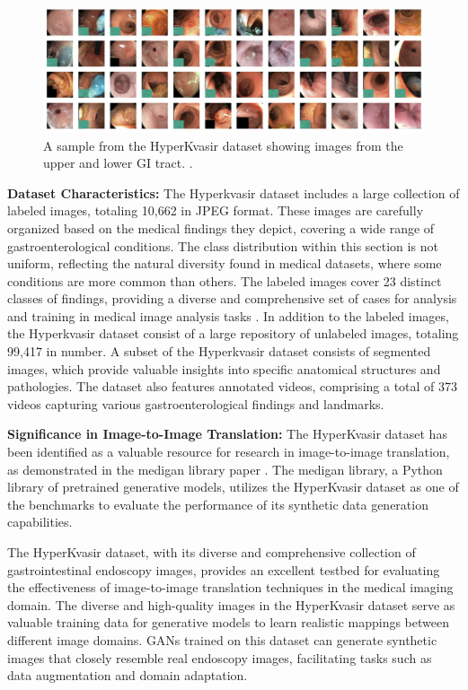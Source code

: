 \documentclass[UKenglish,12pt]{master-style}
\begin{document}
\begin{figure}[ht]
    \centering
    \includegraphics[width=1\textwidth]{Images/hyperKvasir.png}
    \caption{A sample from the HyperKvasir dataset showing images from the upper and lower GI tract.  \cite{HyperKvasir_Dataset}.}
    \label{fig:hyperKvasir}
\end{figure}

\textbf{Dataset Characteristics:} The Hyperkvasir dataset includes a large collection of labeled images, totaling 10,662 in JPEG format. These images are carefully organized based on the medical findings they depict, covering a wide range of gastroenterological conditions. The class distribution within this section is not uniform, reflecting the natural diversity found in medical datasets, where some conditions are more common than others. The labeled images cover 23 distinct classes of findings, providing a diverse and comprehensive set of cases for analysis and training in medical image analysis tasks \cite{HyperKvasir_Dataset}. In addition to the labeled images, the Hyperkvasir dataset consist of a large repository of unlabeled images, totaling 99,417 in number. A subset of the Hyperkvasir dataset consists of segmented images, which provide valuable insights into specific anatomical structures and pathologies. The dataset also features annotated videos, comprising a total of 373 videos capturing various gastroenterological findings and landmarks. 

\textbf{Significance in Image-to-Image Translation: } The HyperKvasir dataset has been identified as a valuable resource for research in image-to-image translation, as demonstrated in the medigan library paper \cite{medigan}.  The medigan library, a Python library of pretrained generative models, utilizes the HyperKvasir dataset as one of the benchmarks to evaluate the performance of its synthetic data generation capabilities. 

The HyperKvasir dataset, with its diverse and comprehensive collection of gastrointestinal endoscopy images, provides an excellent testbed for evaluating the effectiveness of image-to-image translation techniques in the medical imaging domain. The diverse and high-quality images in the HyperKvasir dataset serve as valuable training data for generative models to learn realistic mappings between different image domains. GANs trained on this dataset can generate synthetic images that closely resemble real endoscopy images, facilitating tasks such as data augmentation and domain adaptation.
\end{document}
